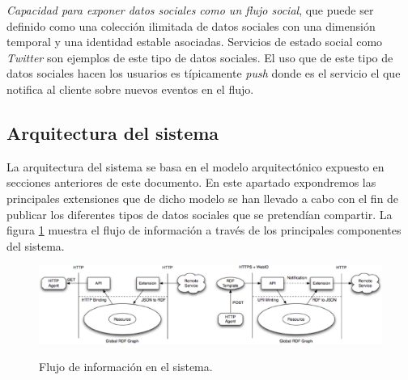 \begin{itemize}
\textit{Capacidad para exponer datos sociales como un flujo social}, que puede ser definido como una colecci\'on ilimitada de datos sociales con una dimensi\'on temporal y una identidad estable asociadas. Servicios de estado social como \textit{Twitter} son ejemplos de este tipo de datos sociales. El uso que de este tipo de datos sociales hacen los usuarios es t\'ipicamente \textit{push} donde es el servicio el que notifica al cliente sobre nuevos eventos en el flujo. 
\end{itemize}

\subsection{Arquitectura del sistema}

La arquitectura del sistema se basa en el modelo arquitect\'onico expuesto en secciones anteriores de este documento. En este apartado expondremos las principales extensiones que de dicho modelo se han llevado a cabo con el fin de publicar los diferentes tipos de datos sociales que se pretend\'ian compartir. La figura \ref{figura5} muestra el flujo de informaci\'on a trav\'es de los principales componentes del sistema.\\

\begin{figure}
\centering
\caption{Flujo de informaci\'on en el sistema.}
\vspace{5mm}
\includegraphics[width=1\textwidth]{figura5}
\label{figura5}
\end{figure}


